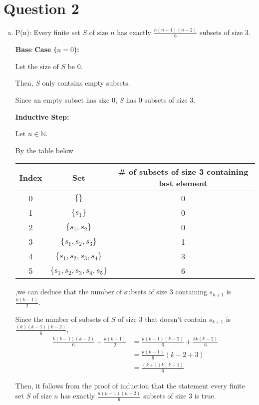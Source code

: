\documentclass[12pt]{article}
\begin{document}
\section*{Question 2}
\begin{enumerate}[a.]
    \item

    P(n): Every finite set $S$ of size $n$ has exactly $\frac{n(n-1)(n-2)}{6}$
    subsets of size 3.

    \textbf{Base Case ($n = 0$):}

    \bigskip

    Let the size of $S$ be 0.

    \bigskip

    Then, $S$ only contains empty subsets.

    \bigskip

    Since an empty subset has size 0, $S$ has 0 subsets of size 3.

    \bigskip

    \textbf{Inductive Step:}

    \bigskip

    Let $n \in \mathbb{N}$.

    \bigskip

    By the table below

    \begin{tabular}{c | c | c}
        Index & Set & \# of subsets of size 3 containing last element\\
        \hline
        0 & $\{\}$ & 0\\
        \hline
        1 & $\{s_1\}$ & 0\\
        \hline
        2 & $\{s_1,s_2\}$ & 0\\
        \hline
        3 & $\{s_1,s_2,s_3\}$ & 1\\
        \hline
        4 & $\{s_1,s_2,s_3,s_4\}$ & 3\\
        \hline
        5 & $\{s_1,s_2,s_3,s_4,s_5\}$ & 6\\
    \end{tabular}

    ,we can deduce that the number of subsets of size 3 containing
    $s_{k+1}$ is $\frac{k(k-1)}{2}$.

    \bigskip

    Since the number of subsets of $S$ of size 3 that doesn't contain $s_{k+1}$ is
    $\frac{(k)(k-1)(k-2)}{6}$,
    \setcounter{equation}{0}
    \begin{align}
        \frac{k(k-1)(k-2)}{6} + \frac{k(k-1)}{2} &= \frac{k(k-1)(k-2)}{6} + \frac{3k(k-2)}{6}\\
        &= \frac{k(k-1)}{6}(k-2 + 3)\\
        &= \frac{(k+1)k(k-1)}{6}
    \end{align}

    Then, it follows from the proof of induction that the statement every finite
    set $S$ of size $n$ has exactly $\frac{n(n-1)(n-2)}{6}$ subsets of size 3 is true.

\end{enumerate}
\end{document}
